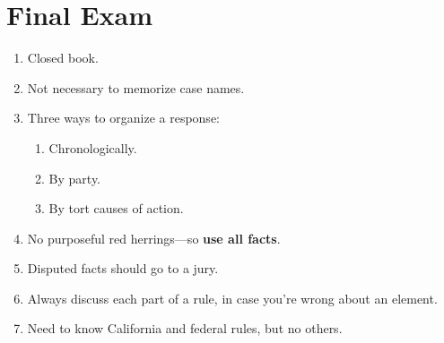 \section{Final Exam}

\begin{enumerate}
    \item Closed book.
    \item Not necessary to memorize case names.
    \item Three ways to organize a response:
    \begin{enumerate}
        \item Chronologically.
        \item By party.
        \item By tort causes of action.
    \end{enumerate}
    \item No purposeful red herrings---so \textbf{use all facts}.
    \item Disputed facts should go to a jury.
    \item Always discuss each part of a rule, in case you're wrong about an element.
    \item Need to know California and federal rules, but no others.
\end{enumerate}
